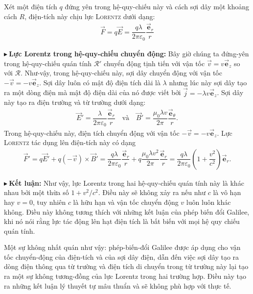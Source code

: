 \documentclass[12pt]{book}
\newcommand{\trianglebold}[1]{\noindent$\blacktriangleright\ $\textbf{#1}\textbf{:}}
\begin{document}
Xét một điện tích $q$ đứng yên trong hệ-quy-chiếu này và cách sợi dây một khoảng cách $R$, điện-tích này chịu lực \textsc{Lorentz} dưới dạng:
\begin{align}
    \vec{F}=q\vec{E}=\dfrac{q\lambda}{2\pi\varepsilon_0}\dfrac{\vec{\textbf{e}}_r}{r}
\end{align}

\trianglebold{Lực Lorentz trong hệ-quy-chiếu chuyển động}
Bây giờ chúng ta đứng-yên trong hệ-quy-chiếu quán tính $\mathscr{R}'$ chuyển động tịnh tiến với vận tốc $\vec{v}=v\vec{\textbf{e}}_z$ so với $\mathscr{R}$. Như-vậy, trong hệ-quy-chiếu này, sợi dây chuyển động với vận tốc $-\vec{v}=-v\vec{\textbf{e}}_z$. Sợi dây luôn có mật độ điện tích dài là $\lambda$ nhưng lúc này sợi dây tạo ra một dòng điện mà mật độ điện dài của nó được viết bởi $\vec{j}=-\lambda v\vec{\textbf{e}}_z$. Sợi dây này tạo ra điện trường và từ trường dưới dạng:
\begin{align}
    \vec{E}'=\dfrac{\lambda}{2\pi\varepsilon_0}\dfrac{\vec{\textbf{e}}_r}{r}\quad\text{và}\quad\vec{B}'=\dfrac{\mu_0\lambda v}{2\pi}\dfrac{\vec{\textbf{e}}_\theta}{r}.
\end{align}
Trong hệ-quy-chiếu này, điện tích chuyển động với vận tốc $-\vec{v}=-v\vec{\textbf{e}}_z$. Lực \textsc{Lorentz} tác dụng lên điện-tích này có dạng
\begin{align}
    \vec{F}'=q\vec{E}'+q(-\vec{v})\times\vec{B}'=\dfrac{q\lambda}{2\pi\varepsilon_0}\dfrac{\vec{\textbf{e}}_r}{r}+q\dfrac{\mu_0\lambda v^2}{2\pi}\dfrac{\vec{\textbf{e}}_r}{r}=\dfrac{q\lambda}{2\pi\varepsilon_0}\left(1+\dfrac{v^2}{c^2}\right)\vec{\textbf{e}}_r.
\end{align}


\trianglebold{Kết luận}
Như vậy, lực Lorentz trong hai hệ-quy-chiếu quán tính này là khác nhau bởi một thừa số $1+v^2/c^2$. Điều này sẽ không xảy ra nếu như $c$ là vô hạn hay $v=0$, tuy nhiên $c$ là hữu hạn và vận tốc chuyển động $v$ luôn luôn khác không. Điều này không tương thích với những kết luận của phép biến đổi Galilee, khi nó nói rằng lực tác động lên hạt điện tích là bất biến với mọi hệ quy chiếu quán tính. 


Một sự không nhất quán như vậy: phép-biến-đổi Galilee được áp dụng cho vận tốc chuyển-động của điện-tích và của sợi dây điện, dẫn đến việc sợi dây tạo ra dòng điện thông qua từ trường và điện tích di chuyển trong từ trường này lại tạo ra một sự không tương-đồng của lực Lorentz trong hai trường hợp. Điều này tạo ra những kết luận lý thuyết tự mâu thuẩn và sẽ không phù hợp với thực tế.
\end{document}
